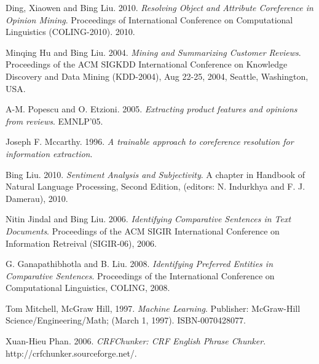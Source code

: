 \documentclass[12pt]{extarticle}
\begin{document}
\renewcommand{\refname}{Tham khảo} 

\newpage
\begin{thebibliography}{30}

	Ding, Xiaowen and Bing Liu. 2010.
	\textit{Resolving Object and Attribute Coreference in Opinion Mining}. 
	Proceedings of International Conference on Computational Linguistics (COLING-2010). 2010.
	 
	Minqing Hu and Bing Liu. 2004.
	\textit{Mining and Summarizing Customer Reviews}.
	Proceedings of the ACM SIGKDD International Conference on Knowledge Discovery and Data Mining (KDD-2004), Aug 22-25, 2004, Seattle, Washington, USA.

	A-M. Popescu and O. Etzioni. 2005. 
	\textit{Extracting product features and opinions from reviews}.
	EMNLP’05.

	Joseph F. Mccarthy. 1996.
 	\textit{A trainable approach to coreference resolution for information extraction}.

 	Bing Liu. 2010.
 	\textit{Sentiment Analysis and Subjectivity}. A chapter in 
  	Handbook of Natural Language Processing, Second Edition, 
  	(editors: N. Indurkhya and F. J. Damerau), 2010.

  	Nitin Jindal and Bing Liu. 2006.  
  	\textit{Identifying Comparative Sentences in Text Documents}. 
   	Proceedings of the ACM SIGIR International Conference on 
   	Information Retreival (SIGIR-06), 2006.

	G. Ganapathibhotla and B. Liu. 2008.
	\textit{Identifying Preferred Entities in Comparative Sentences}.
	Proceedings of the International Conference on Computational Linguistics, COLING, 2008.

	Tom Mitchell, McGraw Hill, 1997.
	\textit{Machine Learning}.
	Publisher: McGraw-Hill Science/Engineering/Math; (March 1, 1997). ISBN-0070428077.	

	Xuan-Hieu Phan. 2006.
	\textit{CRFChunker: CRF English Phrase Chunker}. 
	http://crfchunker.sourceforge.net/.
 
\end{thebibliography}	
\end{document}
